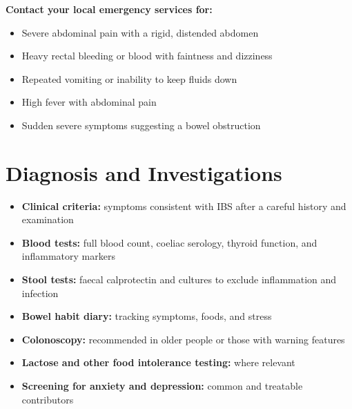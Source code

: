 \textbf{Contact your local emergency services for:}
\begin{itemize}
    \item Severe abdominal pain with a rigid, distended abdomen
    \item Heavy rectal bleeding or blood with faintness and dizziness
    \item Repeated vomiting or inability to keep fluids down
    \item High fever with abdominal pain
    \item Sudden severe symptoms suggesting a bowel obstruction
\end{itemize}

\section*{Diagnosis and Investigations}
\begin{itemize}
    \item \textbf{Clinical criteria:} symptoms consistent with IBS after a careful history and examination
    \item \textbf{Blood tests:} full blood count, coeliac serology, thyroid function, and inflammatory markers
    \item \textbf{Stool tests:} faecal calprotectin and cultures to exclude inflammation and infection
    \item \textbf{Bowel habit diary:} tracking symptoms, foods, and stress
    \item \textbf{Colonoscopy:} recommended in older people or those with warning features
    \item \textbf{Lactose and other food intolerance testing:} where relevant
    \item \textbf{Screening for anxiety and depression:} common and treatable contributors
\end{itemize}

